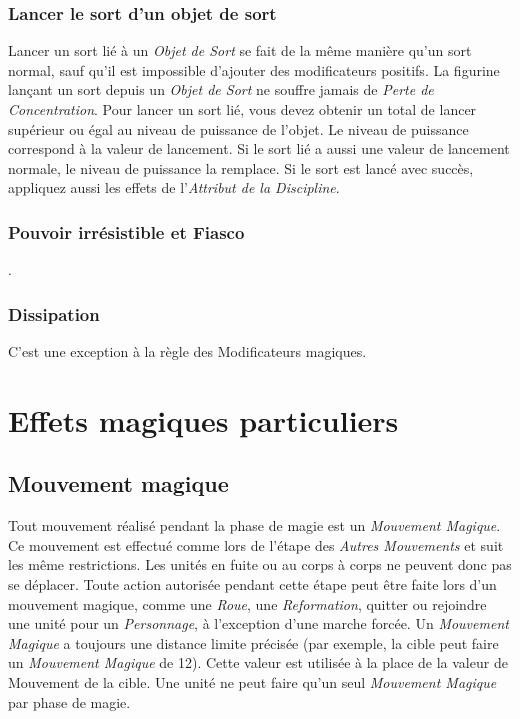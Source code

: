\subsubsection*{Lancer le sort d'un objet de sort}
Lancer un sort lié à un \emph{Objet de Sort} se fait de la même manière qu'un sort normal, sauf qu'il est impossible d'ajouter des modificateurs positifs. La figurine lançant un sort depuis un \emph{Objet de Sort} ne souffre jamais de \emph{Perte de Concentration}. Pour lancer un sort lié, vous devez obtenir un total de lancer supérieur ou égal au niveau de puissance de l'objet. Le niveau de puissance correspond à la valeur de lancement. Si le sort lié a aussi une valeur de lancement normale, le niveau de puissance la remplace. Si le sort est lancé avec succès, appliquez aussi les effets de l'\emph{Attribut de la Discipline}.

\subsubsection*{Pouvoir irrésistible et Fiasco}
.

\subsubsection*{Dissipation}
 C'est une exception à la règle des Modificateurs magiques.

\section{Effets magiques particuliers}

\subsection{Mouvement magique}

Tout mouvement réalisé pendant la phase de magie est un \emph{Mouvement Magique}. Ce mouvement est effectué comme lors de l'étape des \emph{Autres Mouvements} et suit les même restrictions. Les unités en fuite ou au corps à corps ne peuvent donc pas se déplacer. Toute action autorisée pendant cette étape peut être faite lors d'un mouvement magique, comme une \emph{Roue}, une \emph{Reformation}, quitter ou rejoindre une unité pour un \emph{Personnage}, à l'exception d'une marche forcée. Un \emph{Mouvement Magique} a toujours une distance limite précisée (par exemple, la cible peut faire un \emph{Mouvement Magique} de 12{\pouce}). Cette valeur est utilisée à la place de la valeur de Mouvement de la cible. Une unité ne peut faire qu'un seul \emph{Mouvement Magique} par phase de magie.

